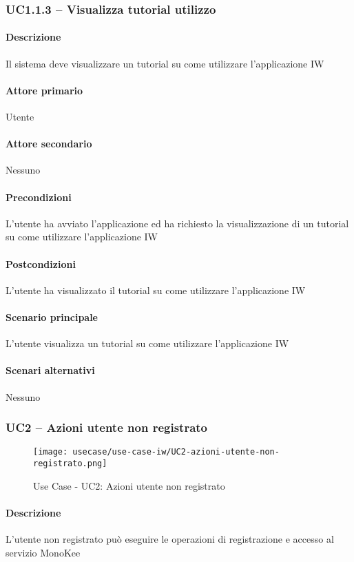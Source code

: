 \subsubsection{UC1.1.3 – Visualizza tutorial utilizzo}
\paragraph{Descrizione}  Il sistema deve visualizzare un tutorial su come utilizzare l’applicazione IW
\paragraph{Attore primario}  Utente
\paragraph{Attore secondario}  Nessuno
\paragraph{Precondizioni}  L’utente ha avviato l’applicazione ed ha richiesto la visualizzazione di un tutorial su come utilizzare l’applicazione IW
\paragraph{Postcondizioni}  L’utente ha visualizzato il tutorial su come utilizzare l’applicazione IW
\paragraph{Scenario principale}  
L’utente visualizza un tutorial su come utilizzare l’applicazione IW
\paragraph{Scenari alternativi}  Nessuno


\subsubsection{UC2 – Azioni utente non registrato}
\begin{figure}[!htbp] 
    \centering 
    \texttt{[image: usecase/use-case-iw/UC2-azioni-utente-non-registrato.png]} 
    \caption{Use Case - UC2: Azioni utente non registrato}
\end{figure}

\paragraph{Descrizione}  L’utente non registrato può eseguire le operazioni di registrazione e accesso al servizio MonoKee 
